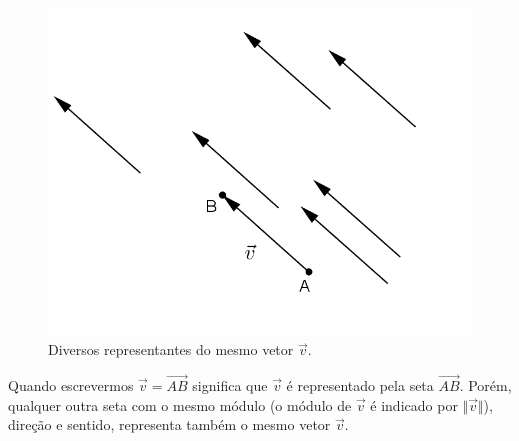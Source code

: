 \begin{figure}[H]
\centering
\includegraphics[scale=0.92]{analitica/imagens/vetor3.png}
\caption{Diversos representantes do mesmo vetor $\vec{v}$.}
\label{fig:vetor}
\end{figure}

\vspace{-0.4cm}
Quando escrevermos $\vec{v}=\overrightarrow{AB}$ significa que $\vec{v}$ é representado pela seta $\overrightarrow{AB}$. Porém, qualquer outra seta com o mesmo módulo (o módulo de $\vec v$ é indicado por $\Vert \vec v \Vert$), direção e sentido, representa também o mesmo vetor $\vec{v}$.

